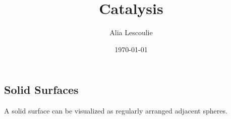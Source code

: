 \documentclass[a4paper, 12 pt]{article}
\author{Alia Lescoulie}
\title{\vspace{-1.5cm}Catalysis}
\date{\today}
\begin{document}
\maketitle
\begin{flushleft}
\section{Solid Surfaces}

A solid surface can be visualized as regularly arranged adjacent spheres. 


\end{flushleft}
\end{document}
